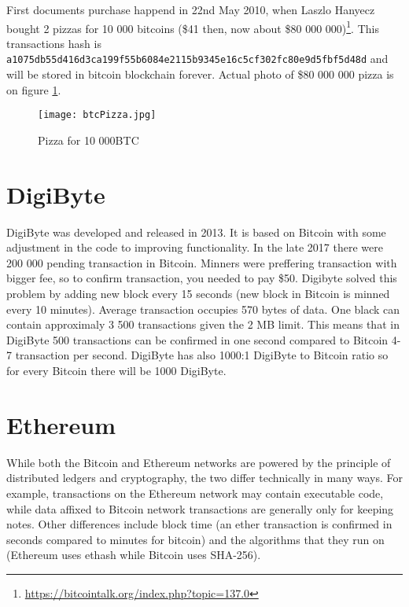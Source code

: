 First documents purchase happend in 22nd May 2010, when Laszlo Hanyecz bought 2 pizzas for 10 000 bitcoins (\$41 then, now about \$80 000 000)\footnote{\url{https://bitcointalk.org/index.php?topic=137.0}}. This transactions hash is \texttt{a1075db55d416d3ca199f55b6084e\-2115b9345e16c5cf302fc80e9d5fbf5d48d} and will be stored in bitcoin blockchain forever. Actual photo of \$80 000 000 pizza is on figure \ref{bitcoinPizza}. 

\begin{figure}[h]
    \centering
    \texttt{[image: btcPizza.jpg]}
    \caption{Pizza for 10 000BTC}
    \label{bitcoinPizza}
\end{figure}


\section{DigiByte}
DigiByte was developed and released in 2013. It is based on Bitcoin with some adjustment in the code to improving functionality. In the late 2017 there were 200 000 pending transaction in Bitcoin. Minners were preffering transaction with bigger fee, so to confirm transaction, you needed to pay \$50. Digibyte solved this problem by adding new block every 15 seconds (new block in Bitcoin is minned every 10 minutes). Average transaction occupies 570 bytes of data. One black can contain approximaly 3 500 transactions given the 2 MB limit. This means that in DigiByte 500 transactions can be confirmed in one second compared to Bitcoin 4-7 transaction per second. DigiByte has also 1000:1 DigiByte to Bitcoin ratio so for every Bitcoin there will be 1000 DigiByte.


\section{Ethereum}
While both the Bitcoin and Ethereum networks are powered by the principle of distributed ledgers and cryptography, the two differ technically in many ways. For example, transactions on the Ethereum network may contain executable code, while data affixed to Bitcoin network transactions are generally only for keeping notes. Other differences include block time (an ether transaction is confirmed in seconds compared to minutes for bitcoin) and the algorithms that they run on (Ethereum uses ethash while Bitcoin uses SHA-256). 



